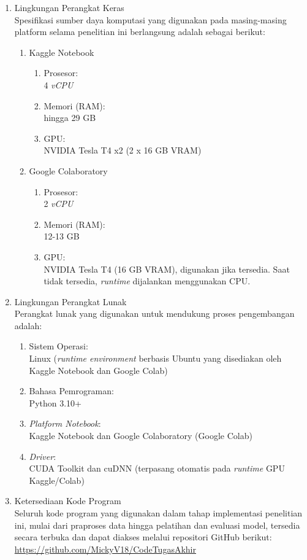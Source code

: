 \begin{enumerate}
	\item Lingkungan Perangkat Keras \\
	Spesifikasi sumber daya komputasi yang digunakan pada masing-masing platform selama penelitian ini berlangsung adalah sebagai berikut:
	\begin{enumerate}
		\item Kaggle Notebook
		\begin{enumerate}
			\item Prosesor: \\ 4 \textit{vCPU}
			\item Memori (RAM): \\ hingga 29 GB
			\item GPU: \\ NVIDIA Tesla T4 x2 (2 x 16 GB VRAM)
		\end{enumerate}
		\item Google Colaboratory
		\begin{enumerate}
			\item Prosesor: \\ 2 \textit{vCPU}
			\item Memori (RAM): \\ 12-13 GB
			\item GPU: \\ NVIDIA Tesla T4 (16 GB VRAM), digunakan jika tersedia. Saat tidak tersedia, \textit{runtime} dijalankan menggunakan CPU.
		\end{enumerate}
	\end{enumerate}
	
	\item Lingkungan Perangkat Lunak \\
	Perangkat lunak yang digunakan untuk mendukung proses pengembangan adalah:
	\begin{enumerate}
		\item Sistem Operasi: \\ Linux (\textit{runtime environment} berbasis Ubuntu yang disediakan oleh Kaggle Notebook dan Google Colab)
		\item Bahasa Pemrograman: \\ Python 3.10+
		\item \textit{Platform Notebook}: \\ Kaggle Notebook dan Google Colaboratory (Google Colab)
		\item \textit{Driver}: \\ CUDA Toolkit dan cuDNN (terpasang otomatis pada \textit{runtime} GPU Kaggle/Colab)
	\end{enumerate}
	
	\item Ketersediaan Kode Program \\
	Seluruh kode program yang digunakan dalam tahap implementasi penelitian ini, mulai dari praproses data hingga pelatihan dan evaluasi model, tersedia secara terbuka dan dapat diakses melalui repositori GitHub berikut: \url{https://github.com/MickyV18/CodeTugasAkhir}
\end{enumerate}

